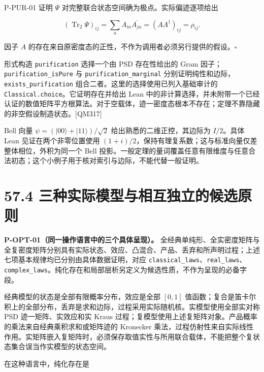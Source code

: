 \documentclass[
  11pt,
  oneside]{book}
\begin{document}
P-PUR-01 证明 \(\Psi\) 对完整联合状态空间确为极点。实际偏迹逐项给出

\[
(\operatorname{Tr}_{2}\Psi)_{ij}
=\sum_a A_{ia}\overline{A_{ja}}
=(AA^\dagger)_{ij}=\rho_{ij}.
\]

因子 \(A\)
的存在来自原密度态的正性，不作为调用者必须另行提供的假设。\(\square\)

形式构造 \texttt{purification} 选择一个由 PSD 存在性给出的 Gram
因子；\texttt{purification\_\allowbreak isPure} 与 \texttt{purification\_\allowbreak marginal}
分别证明纯性和边际，\texttt{exists\_\allowbreak purification}
组合二者。这里的选择使用已列入基础审计的
\texttt{Classical.choice}。它证明存在并给出 Lean
中的非计算选择，并未附带一个已经认证的数值矩阵平方根算法。对于空载体，迹一密度态根本不存在；定理不靠隐藏的非空假设制造状态。{[}QM317{]}

Bell 向量 \(\psi=(|00\rangle+|11\rangle)/\sqrt2\)
给出熟悉的二维正控，其边际为 \(I/2\)。具体 Lean 见证在两个非零位置使用
\((1+i)/2\)，保持有理复系数；这与标准向量仅差整体相位，外积为同一个 Bell
投影。一般定理的量词覆盖任意有限维度与任意合法初态；这个小例子用于核对索引与边际，不能代替一般证明。

\hypertarget{ux4e09ux79cdux5b9eux9645ux6a21ux578bux4e0eux76f8ux4e92ux72ecux7acbux7684ux5019ux9009ux539fux5219}{%
\section{57.4
三种实际模型与相互独立的候选原则}\label{ux4e09ux79cdux5b9eux9645ux6a21ux578bux4e0eux76f8ux4e92ux72ecux7acbux7684ux5019ux9009ux539fux5219}}

\protect\hypertarget{p-opt-01}{}{}

\textbf{P-OPT-01（同一操作语言中的三个具体呈现）。}
全经典单纯形、全实密度矩阵与全复密度矩阵分别具有实际状态、效应、凸混合、产品、丢弃和所声明过程；上述七项基本规律均已分别由具体数据证明，对应
\texttt{classical\_\allowbreak laws}、\allowbreak \texttt{real\_\allowbreak laws}、\allowbreak \texttt{complex\_\allowbreak laws}。纯化存在和局部层析另定义为候选性质，不作为呈现的必备字段。

经典模型的状态是全部有限概率分布，效应是全部 \([0,1]\)
值函数；复合是笛卡尔积上的全部分布，丢弃是求和边际，过程采用实际随机核。实模型使用全部实对称
PSD 迹一矩阵、实效应和实 Kraus
过程；复模型使用上述复矩阵对象。产品概率的乘法来自经典乘积求和或矩阵迹的
Kronecker
乘法，过程仿射性来自实际线性作用。实矩阵嵌入复矩阵时，必须保存取值实性与所用联合载体，不能把整个复状态集合误当作实模型的状态空间。

在这种语言中，纯化存在是
\end{document}
